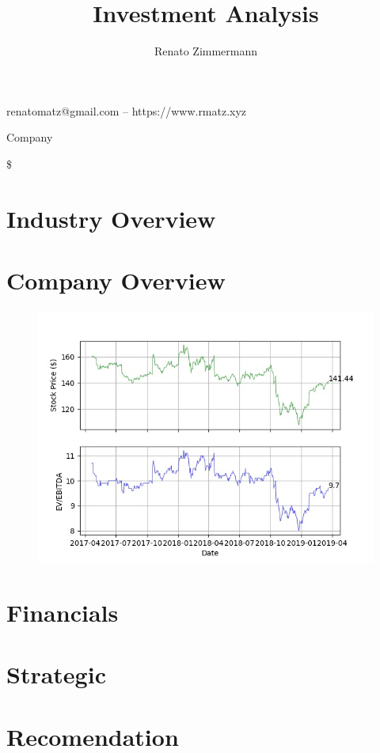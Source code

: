 \documentclass{article}
\makeatletter
\renewcommand{\maketitle}{
\hspace{-.4cm}\begin{minipage}[t]{.6\textwidth}
{\huge\bfseries\thetitle}

\vspace{.1cm}{\large\itshape\theauthor}

renatomatz@gmail.com -- https://www.rmatz.xyz

\end{minipage}
\hfill\vline\hfill
\begin{minipage}[t]{.3\textwidth}
{\Large\company}

\vspace{.1cm}{\large\bfseries\ticker}

\$
\end{minipage}
\vspace{.5cm}
\hline\hline
}
\newcommand{\company}{Company}
\newcommand{\ticker}{TKR}
\makeatother
\begin{document}
\title{Investment Analysis}
\author{Renato Zimmermann}

\maketitle

\section{Industry Overview}

\section{Company Overview}

\begin{figure}[!h]
\includegraphics[width=\linewidth]{graph.jpg}
\end{figure}

\section{Financials}

\section{Strategic}

\section{Recomendation}
\end{document}

